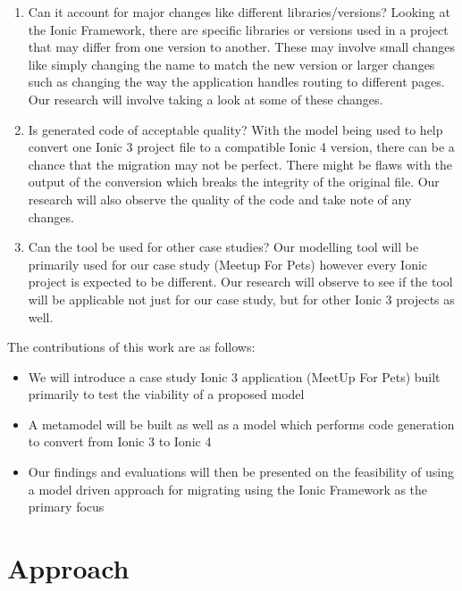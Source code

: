\documentclass[conference]{IEEEtran}
\begin{document}
\begin{enumerate}
    \item Can it account for major changes like different libraries/versions?
    \newline Looking at the Ionic Framework, there are specific libraries or versions used in a project that may differ from one version to another. 
    These may involve small changes like simply changing the name to match the new version or larger changes such as changing the way the application handles routing to different pages. 
    Our research will involve taking a look at some of these changes.
    \item Is generated code of acceptable quality?
    \newline With the model being used to help convert one Ionic 3 project file to a compatible Ionic 4 version, there can be a chance that the migration may not be perfect. 
    There might be flaws with the output of the conversion which breaks the integrity of the original file. Our research will also observe the quality of the code and take note of any changes.
    \item Can the tool be used for other case studies?
    \newline Our modelling tool will be primarily used for our case study (Meetup For Pets) however every Ionic project is expected to be different. 
    Our research will observe to see if the tool will be applicable not just for our case study, but for other Ionic 3 projects as well. 
\end{enumerate}
The contributions of this work are as follows:
\begin{itemize}
    \item We will introduce a case study Ionic 3 application (MeetUp For Pets) built primarily to test the viability of a proposed model
    \item A metamodel will be built as well as a model which performs code generation to convert from Ionic 3 to Ionic 4
    \item Our findings and evaluations will then be presented on the feasibility of using a model driven approach for migrating using the Ionic Framework as the primary focus
\end{itemize}

\section{Approach}
\end{document}
